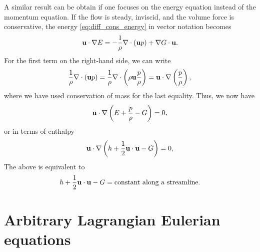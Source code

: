 \documentclass[oneside,a4paper,11pt]{report}
\begin{document}
A similar result can be obtain if one focuses on the energy equation instead of the momentum equation. If the flow is steady, inviscid, and the volume force is conservative, the energy \cref{eq:diff_cons_energy} in vector notation becomes
\begin{equation}
    \mathbf{u} \cdot \nabla E = - \frac{1}{\rho} \nabla \cdot (\mathbf{u} p) + \nabla G \cdot \mathbf{u}.
\end{equation}
For the first term on the right-hand side, we can write
\begin{equation}
    \frac{1}{\rho} \nabla \cdot (\mathbf{u} p) = \frac{1}{\rho} \nabla \cdot \left ( \rho \mathbf{u} \frac{p}{\rho} \right ) = \mathbf{u} \cdot \nabla \left ( \frac{p}{\rho} \right),
\end{equation}
where we have used conservation of mass for the last equality. Thus, we now have
\begin{equation}
     \mathbf{u} \cdot \nabla \left ( E + \frac{p}{\rho} -G \right ) = 0,
\end{equation}
or in terms of enthalpy
\begin{equation}
     \mathbf{u} \cdot \nabla \left ( h + \frac{1}{2} \mathbf{u} \cdot \mathbf{u} -G \right ) = 0,
\end{equation}
The above is equivalent to 
\begin{equation}
\label{eq:bernoulli_enthalpy}
    h + \frac{1}{2} \mathbf{u} \cdot \mathbf{u} -G = \text{constant along a streamline}.
\end{equation}

\section{Arbitrary Lagrangian Eulerian equations}
\end{document}
